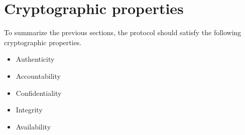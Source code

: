 \section{Cryptographic properties}
To summarize the previous sections, the protocol should satisfy the following cryptographic properties.
\begin{itemize}
  \item Authenticity
  \item Accountability
  \item Confidentiality
  \item Integrity
  \item \scriptsize Availability
\end{itemize}

